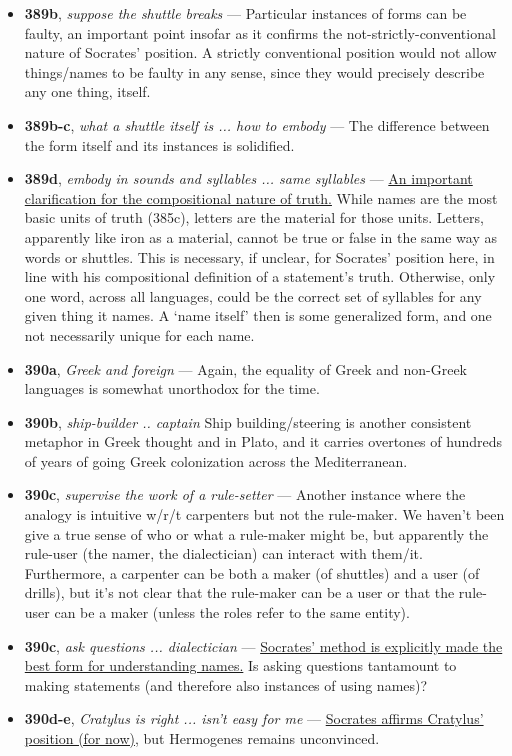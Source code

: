 \documentclass[12pt]{article}
\begin{document}
\begin{itemize}
\item \textbf{389b}, \textit{suppose the shuttle breaks} --- Particular instances of forms can be faulty, an important point insofar as it confirms the not-strictly-conventional nature of Socrates' position. A strictly conventional position would not allow things/names to be faulty in any sense, since they would precisely describe any one thing, itself.

\item \textbf{389b-c}, \textit{what a shuttle itself is ... how to embody} --- The difference between the form itself and its instances is solidified.

\item \textbf{389d}, \textit{embody in sounds and syllables ... same syllables} --- \ul{An important clarification for the compositional nature of truth.} While names are the most basic units of truth (385c), letters are the material for those units. Letters, apparently like iron as a material, cannot be true or false in the same way as words or shuttles. This is necessary, if unclear, for Socrates' position here, in line with his compositional definition of a statement's truth. Otherwise, only one word, across all languages, could be the correct set of syllables for any given thing it names. A `name itself' then is some generalized form, and one not necessarily unique for each name.

\item \textbf{390a}, \textit{Greek and foreign} --- Again, the equality of Greek and non-Greek languages is somewhat unorthodox for the time.

\item \textbf{390b}, \textit{ship-builder .. captain} Ship building/steering is another consistent metaphor in Greek thought and in Plato, and it carries overtones of hundreds of years of going Greek colonization across the Mediterranean.

\item \textbf{390c}, \textit{supervise the work of a rule-setter} --- Another instance where the analogy is intuitive w/r/t carpenters but not the rule-maker. We haven't been give a true sense of who or what a rule-maker might be, but apparently the rule-user (the namer, the dialectician) can interact with them/it. Furthermore, a carpenter can be both a maker (of shuttles) and a user (of drills), but it's not clear that the rule-maker can be a user or that the rule-user can be a maker (unless the roles refer to the same entity).

\item \textbf{390c}, \textit{ask questions ... dialectician} --- \ul{Socrates' method is explicitly made the best form for understanding names.} Is asking questions tantamount to making statements (and therefore also instances of using names)?

\item \textbf{390d-e}, \textit{Cratylus is right ... isn't easy for me} --- \ul{Socrates affirms Cratylus' position (for now)}, but Hermogenes remains unconvinced.

\end{itemize}
\end{document}
